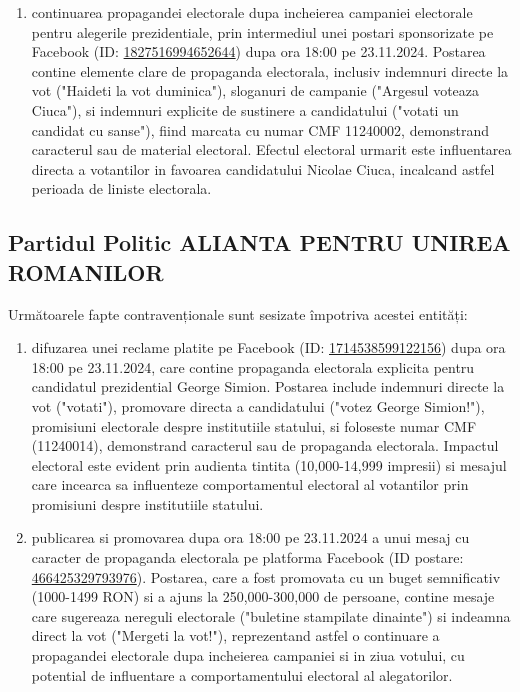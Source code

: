 \documentclass[a4paper,12pt]{article}
\begin{document}
\begin{enumerate}[leftmargin=*, label=\arabic*.)]
    \item continuarea propagandei electorale dupa incheierea campaniei electorale pentru alegerile prezidentiale, prin intermediul unei postari sponsorizate pe Facebook (ID: \href{https://www.facebook.com/ads/library/?id=1827516994652644}{1827516994652644}) dupa ora 18:00 pe 23.11.2024. Postarea contine elemente clare de propaganda electorala, inclusiv indemnuri directe la vot ("Haideti la vot duminica"), sloganuri de campanie ("Argesul voteaza Ciuca"), si indemnuri explicite de sustinere a candidatului ("votati un candidat cu sanse"), fiind marcata cu numar CMF 11240002, demonstrand caracterul sau de material electoral. Efectul electoral urmarit este influentarea directa a votantilor in favoarea candidatului Nicolae Ciuca, incalcand astfel perioada de liniste electorala.
\end{enumerate}

\vspace{0.5cm}

\subsection{Partidul Politic ALIANTA PENTRU UNIREA ROMANILOR}
Următoarele fapte contravenționale sunt sesizate împotriva acestei entități:

\begin{enumerate}[leftmargin=*, label=\arabic*.)]
    \item difuzarea unei reclame platite pe Facebook (ID: \href{https://www.facebook.com/ads/library/?id=1714538599122156}{1714538599122156}) dupa ora 18:00 pe 23.11.2024, care contine propaganda electorala explicita pentru candidatul prezidential George Simion. Postarea include indemnuri directe la vot ("votati"), promovare directa a candidatului ("votez George Simion!"), promisiuni electorale despre institutiile statului, si foloseste numar CMF (11240014), demonstrand caracterul sau de propaganda electorala. Impactul electoral este evident prin audienta tintita (10,000-14,999 impresii) si mesajul care incearca sa influenteze comportamentul electoral al votantilor prin promisiuni despre institutiile statului.
    \item publicarea si promovarea dupa ora 18:00 pe 23.11.2024 a unui mesaj cu caracter de propaganda electorala pe platforma Facebook (ID postare: \href{https://www.facebook.com/ads/library/?id=466425329793976}{466425329793976}). Postarea, care a fost promovata cu un buget semnificativ (1000-1499 RON) si a ajuns la 250,000-300,000 de persoane, contine mesaje care sugereaza nereguli electorale ("buletine stampilate dinainte") si indeamna direct la vot ("Mergeti la vot!"), reprezentand astfel o continuare a propagandei electorale dupa incheierea campaniei si in ziua votului, cu potential de influentare a comportamentului electoral al alegatorilor.
\end{enumerate}
\end{document}

